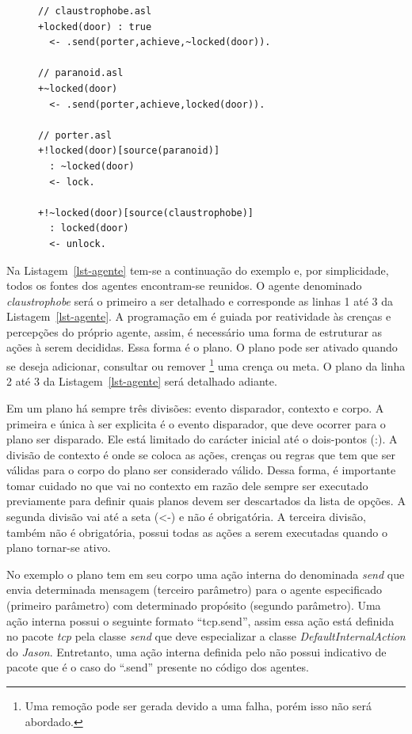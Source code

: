 \lstset{linewidth=75mm}
\begin{figure}
	\begin{lstlisting}[frame=trbl, caption=Agentes em ASL, label=lst-agente]
// claustrophobe.asl
+locked(door) : true
  <- .send(porter,achieve,~locked(door)).

// paranoid.asl
+~locked(door)
  <- .send(porter,achieve,locked(door)).

// porter.asl
+!locked(door)[source(paranoid)]
  : ~locked(door)
  <- lock.

+!~locked(door)[source(claustrophobe)]
  : locked(door)
  <- unlock.
	\end{lstlisting}
\end{figure}
%
Na Listagem~\ref{lst-agente} tem-se a continuação do exemplo e, por
simplicidade, todos os fontes dos agentes encontram-se reunidos. O agente denominado
\emph{claustrophobe} será o primeiro a ser detalhado e corresponde as linhas 1 até 3
da Listagem~\ref{lst-agente}. A programação em \jason é
guiada por reatividade às crenças e percepções do próprio agente, assim, é necessário
uma forma de estruturar as ações à serem decididas. Essa forma é o plano.
O plano pode ser ativado quando se deseja adicionar, consultar ou remover
\footnote{Uma remoção pode ser gerada devido a uma falha, porém isso não será
abordado.} uma crença ou meta. O plano da linha 2 até 3 da
Listagem~\ref{lst-agente} será detalhado adiante.

Em um plano há sempre três divisões: evento disparador, contexto e corpo.
A primeira e única à ser explicita é o evento disparador, que deve ocorrer para
o plano ser disparado. Ele está limitado do carácter inicial até
o dois-pontos (:). A divisão de contexto é onde se coloca as ações, crenças
ou regras que tem que ser válidas para o corpo do plano ser
considerado válido. Dessa forma, é
importante tomar cuidado no que vai no contexto em razão dele sempre ser
executado previamente para definir quais planos devem ser descartados da lista
de opções.
A segunda divisão vai até a seta (<-) e não é obrigatória.
A terceira divisão, também não é obrigatória, possui todas as ações a serem
executadas quando o plano tornar-se ativo.

No exemplo o plano tem em seu corpo
uma ação interna do \jason denominada \emph{send} que envia determinada
mensagem
(terceiro parâmetro) para o agente especificado (primeiro parâmetro) com
determinado propósito (segundo parâmetro). Uma ação interna possui o seguinte
formato ``tcp.send'', assim essa ação está definida no pacote \emph{tcp} pela
classe \emph{send} que deve especializar a classe \emph{DefaultInternalAction}
do \emph{Jason}. Entretanto, uma ação interna definida pelo \jason não possui
indicativo de pacote que é o caso do ``.send'' presente no código dos agentes.

